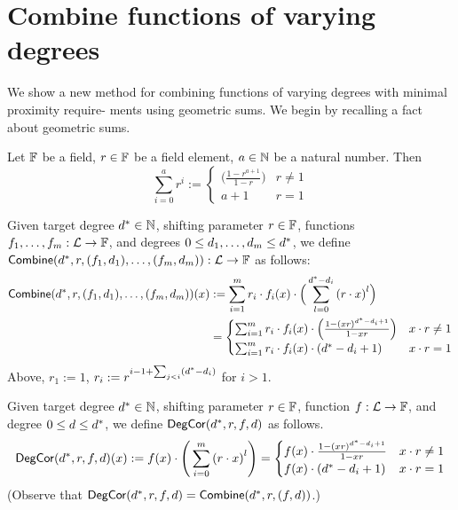 \section{Combine functions of varying degrees}\label{sec:combine}
We show a new method for combining functions of varying degrees with minimal proximity require- ments using geometric sums. We begin by recalling a fact about geometric sums.

\begin{fact}\label{fact:geometric_sum}
    Let $\mathbb{F}$ be a field, $r\in\mathbb{F}$ be a field element, $a\in\mathbb{N}$ be a natural number. Then
    \[
        \sum_{i=0}^{a}r^i:=
        \begin{cases}
        \Big(\frac{1-r^{a+1}}{1-r}\Big) & r\neq 1 \\
        a+1 & r=1
        \end{cases}
    \]
\end{fact}

\begin{definition}\label{def:combine}
    Given target degree $d^*\in\mathbb{N}$, shifting parameter $r\in\mathbb{F}$, functions $f_1,\ldots,f_m:\mathcal{L}\rightarrow\mathbb{F}$, and degrees $0\leq d_1,\ldots,d_m\leq {d}^*$, we define $\mathsf{Combine}(d^*,r,(f_1,d_1),\ldots,(f_m,d_m)):\mathcal{L}\rightarrow\mathbb{F}$ as follows:
    \begin{align*}
        \mathsf{Combine}({d}^*,r,(f_1,d_1),\ldots,(f_m,d_m))(x)&:=\sum_{i=1}^{m}r_i\cdot f_i(x)\cdot \Big(\sum_{l=0}^{d^*-d_i}{(r\cdot x)}^l\Big) \\
        &= 
        \begin{cases}
            \sum_{i=1}^{m}r_i\cdot f_i(x)\cdot \Big(\frac{1-{(xr)}^{d^*-d_i+1}}{1-xr}\Big) & x\cdot r\neq 1\\
            \sum_{i=1}^{m}r_i\cdot f_i(x)\cdot (d^*-d_i+1) & x\cdot r= 1
        \end{cases}
    \end{align*}
Above, $r_1:=1$, $r_i:=r^{i-1+\sum_{j<i}(d^*-d_i)}$ for $i>1$.
\end{definition}

\begin{definition}\label{def:deg_corr}
{}
    Given target degree $d^*\in\mathbb{N}$, shifting parameter $r\in\mathbb{F}$, function $f:\mathcal{L}\rightarrow\mathbb{F}$, and degree $0\leq d\leq d^*$, we define $\mathsf{DegCor}(d^*,r,f,d)$ as follows.
    \[
        \mathsf{DegCor}(d^*,r,f,d)(x):=f(x)\cdot\Bigg(\sum_{i=0}^{m}{(r\cdot x)}^l\Bigg)=
        \begin{cases}
            f(x)\cdot\frac{1-{(xr)}^{d^*-d_i+1}}{1-xr} & x\cdot r\neq 1\\
            f(x)\cdot (d^*-d_i+1) & x\cdot r= 1
        \end{cases}
    \]
(Observe that $\mathsf{DegCor}(d^*,r,f,d)=\mathsf{Combine}(d^*,r,(f,d))$.)
\end{definition}

